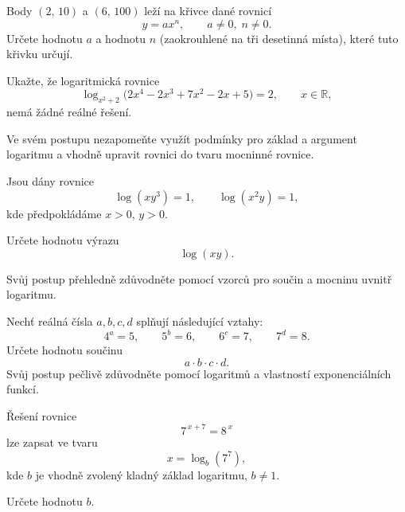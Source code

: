 \begin{exercise}
    Body $(2,\,10)$ a $(6,\,100)$ leží na křivce dané rovnicí
    \[
        y = a x^{n},
        \qquad a \ne 0,\; n \ne 0.
    \]
    Určete hodnotu $a$ a hodnotu $n$ (zaokrouhlené na tři desetinná místa),
    které tuto křivku určují.
\end{exercise}


\begin{exercise}
    Ukažte, že logaritmická rovnice
    \[
        \log_{x^{2} + 2}\!\bigl(2x^{4} - 2x^{3} + 7x^{2} - 2x + 5\bigr) = 2,
        \qquad x \in \mathbb{R},
    \]
    nemá žádné reálné řešení.

    Ve svém postupu nezapomeňte využít podmínky pro základ a argument
    logaritmu a vhodně upravit rovnici do tvaru mocninné rovnice.
\end{exercise}


\setcounter{section}{4}
\begin{exercise}
    Jsou dány rovnice
    \[
        \log(xy^{3}) = 1,
        \qquad
        \log(x^{2}y) = 1,
    \]
    kde předpokládáme $x>0$, $y>0$.
    
    Určete hodnotu výrazu
    \[
        \log(xy).
    \]

    Svůj postup přehledně zdůvodněte pomocí vzorců pro součin a mocninu uvnitř logaritmu.
\end{exercise}


\begin{exercise}
    Nechť reálná čísla $a, b, c, d$ splňují následující vztahy:
    \[
        4^{a} = 5, \qquad
        5^{b} = 6, \qquad
        6^{c} = 7, \qquad
        7^{d} = 8.
    \]
    Určete hodnotu součinu
    \[
        a \cdot b \cdot c \cdot d.
    \]
    Svůj postup pečlivě zdůvodněte pomocí logaritmů a vlastností exponenciálních funkcí.
\end{exercise}


\begin{exercise}
    Řešení rovnice
    \[
        7^{\,x+7} = 8^{\,x}
    \]
    lze zapsat ve tvaru
    \[
        x = \log_{b}\!\left(7^{7}\right),
    \]
    kde $b$ je vhodně zvolený kladný základ logaritmu, $b \neq 1$.

    Určete hodnotu $b$.
\end{exercise}


